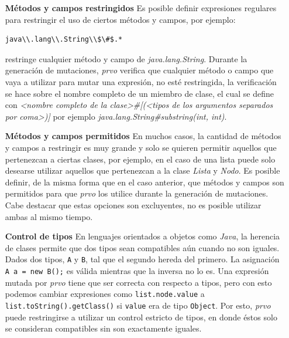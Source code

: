 \begin{enumerate}[leftmargin=.75cm,align=left]
	\item[\textbf{M\'etodos y campos restringidos}] Es posible definir expresiones regulares para restringir el uso de ciertos m\'etodos y campos, por ejemplo:
	\begin{lstlisting}[mathescape=true]
	java\\.lang\\.String\\$\#$.*
	\end{lstlisting}
	restringe cualquier m\'etodo y campo de \emph{java.lang.String}. Durante la generaci\'on de mutaciones, \emph{prvo} verifica que cualquier m\'etodo o campo que vaya a utilizar para mutar una expresi\'on, no est\'e restringida, la verificaci\'on se hace sobre el nombre completo de un miembro de clase, el cual se define con \emph{<nombre completo de la clase>\#<nombre del miembro>[(<tipos de los argumentos separados por coma>)]} por ejemplo \emph{java.lang.String\#substring(int, int)}.
	
	\item[\textbf{M\'etodos y campos permitidos}] En muchos casos, la cantidad de m\'etodos y campos a restringir es muy grande y solo se quieren permitir aquellos que pertenezcan a ciertas clases, por ejemplo, en el caso de una lista puede solo desearse utilizar aquellos que pertenezcan a la clase \emph{Lista} y \emph{Nodo}. Es posible definir, de la misma forma que en el caso anterior, que m\'etodos y campos son permitidos para que \emph{prvo} los utilice durante la generaci\'on de mutaciones. Cabe destacar que estas opciones son excluyentes, no es posible utilizar ambas al mismo tiempo.
	
	\item[\textbf{Control de tipos}] En lenguajes orientados a objetos como \emph{Java}, la herencia de clases permite que dos tipos sean compatibles a\'un cuando no son iguales. Dados dos tipos, \texttt{A} y \texttt{B}, tal que el segundo hereda del primero. La asignaci\'on \lstinline|A a = new B();| es v\'alida mientras que la inversa no lo es. Una expresi\'on mutada por \emph{prvo} tiene que ser correcta con respecto a tipos, pero con esto podemos cambiar expresiones como \lstinline|list.node.value| a \lstinline|list.toString().getClass()| si \texttt{value} era de tipo \texttt{Object}. Por esto, \emph{prvo} puede restringirse a utilizar un control estricto de tipos, en donde \'estos solo se consideran compatibles sin son exactamente iguales.
	

\end{enumerate}
